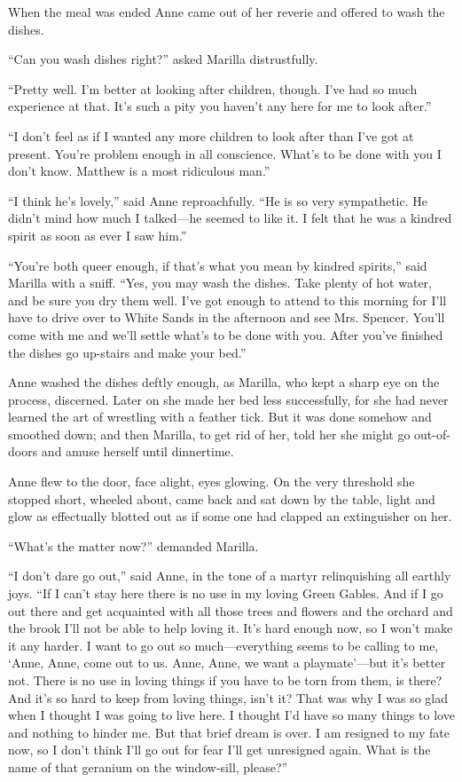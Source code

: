 \documentclass[a4paper]{article}
\begin{document}
When the meal was ended Anne came out of her reverie and offered to wash the dishes.

``Can you wash dishes right?'' asked Marilla distrustfully.

``Pretty well. I'm better at looking after children, though. I've had so much experience at that. It's such a pity you haven't any here for me to look after.''

``I don't feel as if I wanted any more children to look after than I've got at present. You're problem enough in all conscience. What's to be done with you I don't know. Matthew is a most ridiculous man.''

``I think he's lovely,'' said Anne reproachfully. ``He is so very sympathetic. He didn't mind how much I talked---he seemed to like it. I felt that he was a kindred spirit as soon as ever I saw him.''

``You're both queer enough, if that's what you mean by kindred spirits,'' said Marilla with a sniff. ``Yes, you may wash the dishes. Take plenty of hot water, and be sure you dry them well. I've got enough to attend to this morning for I'll have to drive over to White Sands in the afternoon and see Mrs. Spencer. You'll come with me and we'll settle what's to be done with you. After you've finished the dishes go up-stairs and make your bed.''

Anne washed the dishes deftly enough, as Marilla, who kept a sharp eye on the process, discerned. Later on she made her bed less successfully, for she had never learned the art of wrestling with a feather tick. But it was done somehow and smoothed down; and then Marilla, to get rid of her, told her she might go out-of-doors and amuse herself until dinnertime.

Anne flew to the door, face alight, eyes glowing. On the very threshold she stopped short, wheeled about, came back and sat down by the table, light and glow as effectually blotted out as if some one had clapped an extinguisher on her.

``What's the matter now?'' demanded Marilla.

``I don't dare go out,'' said Anne, in the tone of a martyr relinquishing all earthly joys. ``If I can't stay here there is no use in my loving Green Gables. And if I go out there and get acquainted with all those trees and flowers and the orchard and the brook I'll not be able to help loving it. It's hard enough now, so I won't make it any harder. I want to go out so much---everything seems to be calling to me, `Anne, Anne, come out to us. Anne, Anne, we want a playmate'---but it's better not. There is no use in loving things if you have to be torn from them, is there? And it's so hard to keep from loving things, isn't it? That was why I was so glad when I thought I was going to live here. I thought I'd have so many things to love and nothing to hinder me. But that brief dream is over. I am resigned to my fate now, so I don't think I'll go out for fear I'll get unresigned again. What is the name of that geranium on the window-sill, please?''
\end{document}
